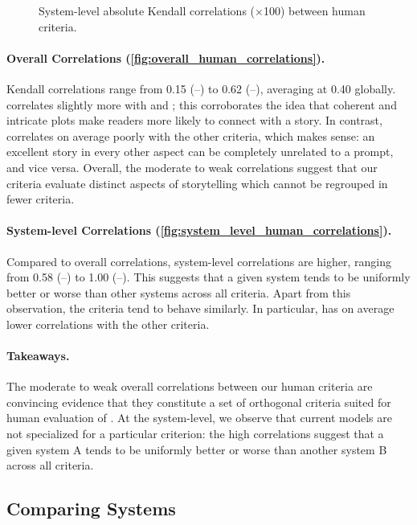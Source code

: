 \begin{figure}[h]
\begin{minipage}{0.45\columnwidth}
    \caption{System-level absolute Kendall correlations ($\times$100) between human criteria.}
    \label{fig:system_level_human_correlations}
\end{minipage}
\end{figure}

\paragraph{Overall Correlations (\autoref{fig:overall_human_correlations}).}
Kendall correlations range from 0.15 (\myre--\mysu) to 0.62 (\mych--\myeg), averaging at 0.40 globally. {\myeg} correlates slightly more with {\mych} and {\mycx}; this corroborates the idea that coherent and intricate plots make readers more likely to connect with a story. In contrast, {\myre} correlates on average poorly with the other criteria, which makes sense: an excellent story in every other aspect can be completely unrelated to a prompt, and vice versa. Overall, the moderate to weak correlations suggest that our criteria evaluate distinct aspects of storytelling which cannot be regrouped in fewer criteria.

\paragraph{System-level Correlations (\autoref{fig:system_level_human_correlations}).}
Compared to overall correlations, system-level correlations are higher, ranging from 0.58 (\myre--\mycx) to 1.00 (\mych--\myeg). This suggests that a given system tends to be uniformly better or worse than other systems across all criteria. Apart from this observation, the criteria tend to behave similarly. In particular, {\myre} has on average lower correlations with the other criteria.

\paragraph{Takeaways.}
The moderate to weak overall correlations between our human criteria are convincing evidence that they constitute a set of orthogonal criteria suited for human evaluation of \asg. At the system-level, we observe that current models are not specialized for a particular criterion: the high correlations suggest that a given system A tends to be uniformly better or worse than another system B across all criteria.

\subsection{Comparing {\asg} Systems}
\label{sub:comparing_asg_systems}

